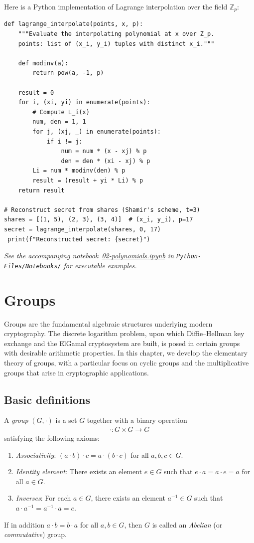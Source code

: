 \documentclass[a4paper, 12pt]{book} %
\newcommand{\notebook}[1]{\begingroup\small\itshape
    See the accompanying notebook~\href{run:./Python-Files/Notebooks/#1}{#1} in \texttt{Python-Files/Notebooks/} for executable examples.%
\endgroup}
\begin{document}
Here is a Python implementation of Lagrange interpolation over the field $\mathbb{Z}_p$:
\begin{verbatim}
def lagrange_interpolate(points, x, p):
    """Evaluate the interpolating polynomial at x over Z_p.
    points: list of (x_i, y_i) tuples with distinct x_i."""

    def modinv(a):
        return pow(a, -1, p)

    result = 0
    for i, (xi, yi) in enumerate(points):
        # Compute L_i(x)
        num, den = 1, 1
        for j, (xj, _) in enumerate(points):
            if i != j:
                num = num * (x - xj) % p
                den = den * (xi - xj) % p
        Li = num * modinv(den) % p
        result = (result + yi * Li) % p
    return result

# Reconstruct secret from shares (Shamir's scheme, t=3)
shares = [(1, 5), (2, 3), (3, 4)]  # (x_i, y_i), p=17
secret = lagrange_interpolate(shares, 0, 17)
 print(f"Reconstructed secret: {secret}")
\end{verbatim}

\notebook{02-polynomials.ipynb}

\chapter{Groups}
\label{ch:groups}

Groups are the fundamental algebraic structures underlying modern cryptography.
The discrete logarithm problem, upon which Diffie--Hellman key exchange and the
ElGamal cryptosystem are built, is posed in certain groups with desirable
arithmetic properties. In this chapter, we develop the elementary theory of
groups, with a particular focus on cyclic groups and the multiplicative groups
that arise in cryptographic applications.

\section{Basic definitions}

\begin{definition}
    A \emph{group} $(G, \cdot)$ is a set $G$ together with a binary operation
    \begin{align}
        \cdot: G \times G \longrightarrow G
    \end{align}
    satisfying the following axioms:
    \begin{enumerate}
        \item \emph{Associativity}: $(a \cdot b) \cdot c = a \cdot (b \cdot c)$ for all $a, b, c \in G$.
        \item \emph{Identity element}: There exists an element $e \in G$ such that $e \cdot a = a \cdot e = a$ for all $a \in G$.
        \item \emph{Inverses}: For each $a \in G$, there exists an element $a^{-1} \in G$ such that $a \cdot a^{-1} = a^{-1} \cdot a = e$.
    \end{enumerate}
    If in addition $a \cdot b = b \cdot a$ for all $a, b \in G$, then $G$ is called an \emph{Abelian} (or \emph{commutative}) group.
\end{definition}
\end{document}

